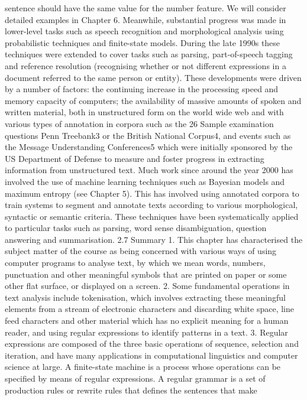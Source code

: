 sentence should have the same value for the number feature. We will consider
detailed examples in Chapter 6.
Meanwhile, substantial progress was made in lower-level tasks such as speech
recognition and morphological analysis using probabilistic techniques and
finite-state models. During the late 1990s these techniques were extended to cover
tasks such as parsing, part-of-speech tagging and reference resolution (recognising
whether or not different expressions in a document referred to the same person or
entity). These developments were driven by a number of factors: the continuing
increase in the processing speed and memory capacity of computers; the availability
of massive amounts of spoken and written material, both in unstructured form on
the world wide web and with various types of annotation in corpora such as the
26
Sample examination questions
Penn Treebank3 or the British National Corpus4, and events such as the Message
Understanding Conferences5 which were initially sponsored by the US Department
of Defense to measure and foster progress in extracting information from
unstructured text.
Much work since around the year 2000 has involved the use of machine learning
techniques such as Bayesian models and maximum entropy (see Chapter 5). This
has involved using annotated corpora to train systems to segment and annotate texts
according to various morphological, syntactic or semantic criteria. These techniques
have been systematically applied to particular tasks such as parsing, word sense
disambiguation, question answering and summarisation.
2.7 Summary
1. This chapter has characterised the subject matter of the course as being
concerned with various ways of using computer programs to analyse text, by
which we mean words, numbers, punctuation and other meaningful symbols
that are printed on paper or some other flat surface, or displayed on a screen.
2. Some fundamental operations in text analysis include tokenisation, which
involves extracting these meaningful elements from a stream of electronic
characters and discarding white space, line feed characters and other material
which has no explicit meaning for a human reader, and using regular
expressions to identify patterns in a text.
3. Regular expressions are composed of the three basic operations of sequence,
selection and iteration, and have many applications in computational linguistics
and computer science at large. A finite-state machine is a process whose
operations can be specified by means of regular expressions. A regular grammar
is a set of production rules or rewrite rules that defines the sentences that make
